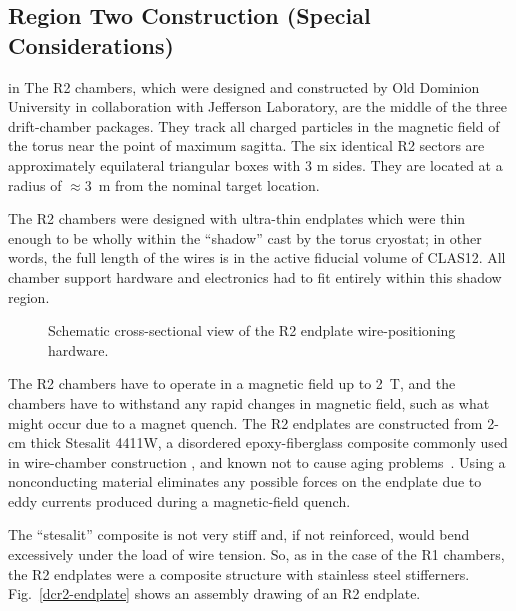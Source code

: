 
\subsection{Region Two Construction (Special Considerations)}

 in 
The R2 chambers, which were designed and constructed by Old Dominion University 
in collaboration with Jefferson Laboratory, are the middle of the three  
drift-chamber packages.  They track all charged particles in the magnetic field 
of the torus near the point of maximum sagitta.  The six identical R2 sectors 
are approximately equilateral triangular boxes with 3 m sides. 
They are located at a radius of $\approx$3~m from the nominal target location.  
  
The R2 chambers were designed with ultra-thin endplates which were thin enough
to be wholly within the ``shadow'' cast by the torus cryostat; in other words,
the full length of the wires is in the active fiducial volume of CLAS12. 
All chamber support hardware and electronics had to fit 
entirely within this shadow region.

\begin{figure}[htpb]   
\vspace{6.0cm}
\caption{\small{Schematic cross-sectional view of the R2 endplate 
wire-positioning hardware.}} 
\label{r2_inserts}
\end{figure}   

The R2 chambers have to operate 
in a magnetic field up to 2~T, and the chambers have to withstand any rapid 
changes in magnetic field, such as what might occur due to a magnet quench.
The R2 endplates are constructed from 2-cm thick Stesalit 4411W, a disordered 
epoxy-fiberglass composite commonly used in wire-chamber construction
\cite{stesalit}, and known not to cause aging problems~\cite{stesalitaging}.  
Using a nonconducting material eliminates any possible forces on the endplate 
due to eddy currents produced during a magnetic-field quench.  

The ``stesalit'' composite is not very stiff and, if not reinforced, would
bend excessively under the load of wire tension.  So, as in the case of
the R1 chambers, the R2 endplates were a composite structure with
stainless steel stifferners.  Fig.~\ref{dcr2-endplate} shows an assembly drawing of an R2 endplate.

